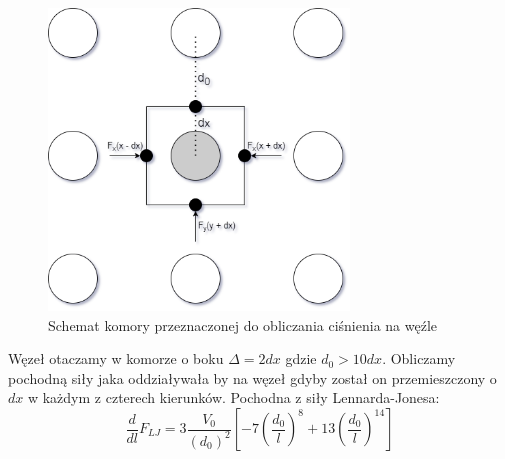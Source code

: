 \documentclass[12pt, letterpaper]{report}
\begin{document}
    \begin{figure}[h]
        \centering
        \includegraphics[width=8cm]{pressure_box}
        \caption{Schemat komory przeznaczonej do obliczania ciśnienia na węźle}
    \end{figure}

    Węzeł otaczamy w komorze o boku $\Delta = 2 dx$ gdzie $d_0 > 10 dx$. 
    Obliczamy pochodną siły jaka oddziaływała by na węzeł gdyby został 
    on przemieszczony o $dx$ w każdym z czterech kierunków. Pochodna z siły Lennarda-Jonesa:
    \begin{equation}
        \frac{d}{dl} F_{LJ} = 3\frac{V_0}{(d_0)^2} \left[ -7 \left(\frac{d_0}{l}\right)^{8} + 13 \left(\frac{d_0}{l}\right)^{14} \right]
    \end{equation}
    
\end{document}
